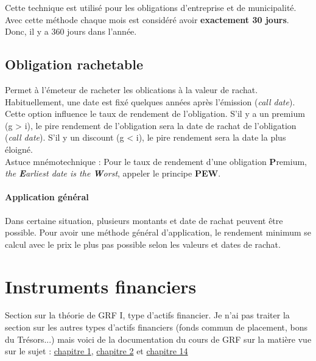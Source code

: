 \documentclass[11pt,french]{report}
\begin{document}
Cette technique est utilisé pour les obligations d'entreprise et de municipalité. Avec cette méthode chaque mois est considéré avoir \textbf{exactement 30 jours}. Donc, il y a 360 jours dans l'année.

\section{Obligation rachetable}
\label{sec:callable bonds}

Permet à l'émeteur de racheter les oblications à la valeur de rachat. Habituellement, une date est fixé quelques années après l'émission (\emph{call date}). Cette option influence le taux de rendement de l'obligation. S'il y a un premium (g > i), le pire rendement de l'obligation sera la date de rachat de l'obligation (\textit{call date}). S'il y un discount (g < i), le pire rendement sera la date la plus éloigné.
\\ Astuce mnémotechnique :
Pour le taux de rendement d'une obligation \textbf{P}remium, \emph{the \textbf{E}arliest date is the \textbf{W}orst}, appeler le principe \textbf{PEW}.
\subsubsection{Application général}
Dans certaine situation, plusieurs montants et date de rachat peuvent être possible. Pour avoir une méthode général d'application, le rendement minimum se calcul avec le prix le plus pas possible selon les valeurs et dates de rachat.



\chapter{Instruments financiers}
\label{chap:financial instruments}

Section sur la théorie de GRF I, type d'actifs financier. Je n'ai pas traiter la section sur les autres types d'actifs financiers (fonds commun de placement, bons du Trésors...) mais voici de la documentation du cours de GRF sur la matière vue sur le sujet : \href{https://drive.google.com/open?id=0B6kXivc6X9LIV09sWEZlLWNtdmc}{chapitre 1}, \href{https://drive.google.com/open?id=0B6kXivc6X9LIdVRwUGRhd0xBR1k}{chapitre 2} et \href{https://drive.google.com/open?id=0B6kXivc6X9LIXzRxSlVsdktMN1E}{chapitre 14}
\end{document}
